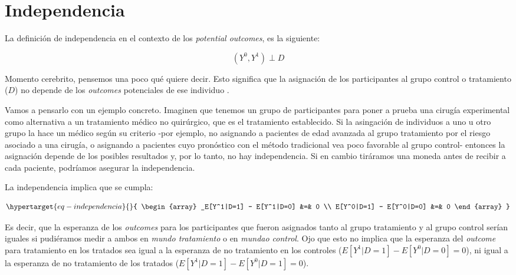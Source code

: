 \documentclass[
  letterpaper,
  DIV=11,
  numbers=noendperiod,
  oneside]{scrreprt}
\begin{document}
\hypertarget{independencia}{%
\section{Independencia}\label{independencia}}

La definición de independencia en el contexto de los \emph{potential
outcomes}, es la siguiente:

\[
(Y^0, Y^1) \perp D
\]

Momento cerebrito, pensemos una poco qué quiere decir. Esto significa
que la asignación de los participantes al grupo control o tratamiento
(\(D\)) no depende de los \emph{outcomes} potenciales de ese individuo
.

Vamos a pensarlo con un ejemplo concreto. Imaginen que tenemos un grupo
de participantes para poner a prueba una cirugía experimental como
alternativa a un tratamiento médico no quirúrgico, que es el tratamiento
establecido. Si la asingación de individuos a uno u otro grupo la hace
un médico según su criterio -por ejemplo, no asignando a pacientes de
edad avanzada al grupo tratamiento por el riesgo asociado a una cirugía,
o asignando a pacientes cuyo pronóstico con el método tradicional vea
poco favorable al grupo control- entonces la asignación depende de los
posibles resultados y, por lo tanto, no hay independencia. Si en cambio
tiráramos una moneda antes de recibir a cada paciente, podríamos
asegurar la independencia.

La independencia implica que se cumpla:

\begin{equation}\protect\hypertarget{eq-independencia}{}{
\begin{array}
_E[Y^1|D=1] - E[Y^1|D=0] &=& 0 \\
E[Y^0|D=1] - E[Y^0|D=0] &=& 0
\end{array}
}\label{eq-independencia}\end{equation}

Es decir, que la esperanza de los \emph{outcomes} para los participantes
que fueron asignados tanto al grupo tratamiento y al grupo control
serían iguales si pudiéramos medir a ambos en \emph{mundo tratamiento} o
en \emph{mundao control}.
Ojo que esto no implica que la esperanza del \emph{outcome} para
tratamiento en los tratados sea igual a la esperanza de no tratamiento
en los controles (\(E[Y^1|D=1] - E[Y^0|D=0] = 0\)), ni igual a la
esperanza de no tratamiento de los tratados
(\(E[Y^1|D=1] - E[Y^0|D=1] = 0\)).
\end{document}
